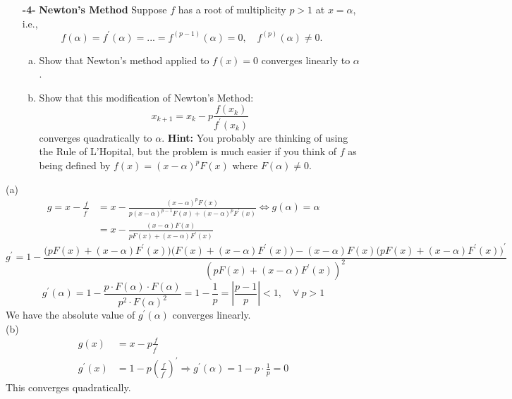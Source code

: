 \documentclass[11pt]{article}
\theoremstyle{definition}
\newcommand{\1}[1]{\mathbf{1} \left \{ #1 \right \}}
\begin{document}
\begin{itemize}
    \item[{\textbf{-4-}}] \textbf{Newton's Method}  Suppose $f$ has a root of multiplicity $p>1$ at $x=\alpha$, i.e.,
    \begin{equation}
        f(\alpha) = f^{\prime} (\alpha) = ... = f^{(p-1)} (\alpha) = 0, \quad f^{(p)} (\alpha) \neq 0.
    \end{equation}
    \begin{enumerate}[a.]
        \item Show that Newton's method applied to $f(x) = 0$ converges linearly to $\alpha$.
        \item Show that this modification of Newton's Method:
        \begin{equation}
            x_{k+1} = x_k - p \frac{f(x_k)}{f^{\prime}(x_k)}
        \end{equation}
        converges quadratically to $\alpha$.  \textbf{Hint:}  You probably are thinking of using the Rule of L'Hopital, but the problem is much easier if you think of $f$ as being defined by $f(x) = (x-\alpha)^p F(x)$ where $F(\alpha) \neq 0.$
        \end{enumerate}
\end{itemize}
(a)
\begin{equation*}
    \begin{split}
        g = x - \frac{f}{f^{\prime}} &= x - \frac{(x-\alpha)^p F(x)}{p(x-\alpha)^{p-1} F(x) + (x-\alpha)^p F^{\prime} (x)} \Longleftrightarrow g(\alpha) = \alpha \\
        &= x - \frac{(x-\alpha) F(x)}{pF(x) + (x-\alpha)F^{\prime}(x)}
    \end{split}
\end{equation*}
\[g^{\prime} = 1 - \frac{\big(pF(x) + (x-\alpha)F^{\prime}(x)\big) \big(F(x) + (x-\alpha)F^{\prime}(x)\big) - (x-\alpha)F(x) \big(pF(x) + (x-\alpha)F^{\prime}(x)\big)^{\prime}}{\left(pF(x) + (x-\alpha)F^{\prime}(x)\right)^2}\]
\[g^{\prime}(\alpha) = 1 - \frac{p \cdot F(\alpha) \cdot F(\alpha)}{p^2 \cdot F(\alpha)^2} = 1 - \frac{1}{p} = \left|\frac{p-1}{p}\right| < 1, \quad \forall \ p > 1\]
We have the absolute value of $g^{\prime}(\alpha)$ converges linearly. \\
(b)
\begin{equation*}
    \begin{split}
        g(x) &= x - p \frac{f}{f^{\prime}} \\
        g^{\prime}(x) &= 1 - p \left(\frac{f}{f^{\prime}}\right)^{\prime} \Longrightarrow g^{\prime}(\alpha) = 1 - p \cdot \frac{1}{p} = 0
    \end{split}
\end{equation*}
This converges quadratically.
\end{document}
